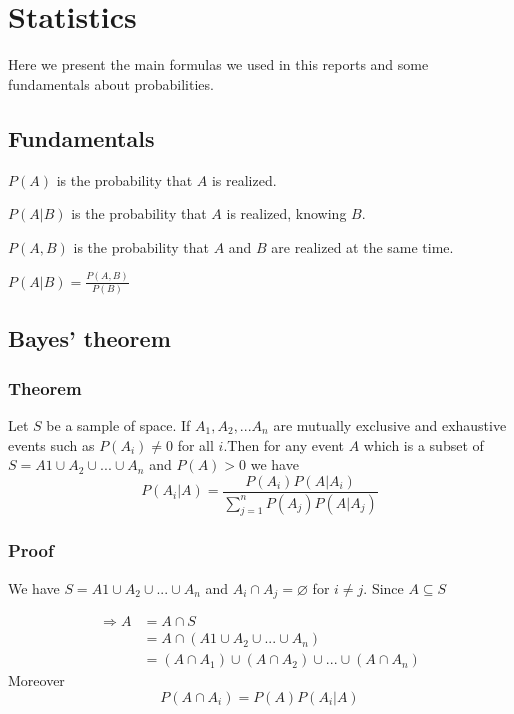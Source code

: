 \chapter{Statistics}\label{app:formulas} Here we present the main formulas we used in this reports and some fundamentals about probabilities.


\section{Fundamentals}\label{f:Fundamentals}

$P(A)$ is the probability that $A$ is realized.\\
\par
$P(A|B)$ is the probability that $A$ is realized, knowing $B$.\\
\par
$P(A,B)$ is the probability that $A$ and $B$ are realized at the same time.\\
\par
$P(A|B) = \frac{P(A,B)}{P(B)}$



\section{Bayes' theorem}\label{f:Bayes}
\subsection{Theorem}
Let $S$ be a sample of space. If $A_1,A_2,...A_n$ are mutually exclusive and exhaustive events such as $P(A_i)\neq 0$ for all $i$.Then for any event $A$ which is a subset of $S = A1\cup A_2 \cup ... \cup A_n$ and $P(A) > 0$ we have
\begin{equation*}
P(A_i|A)= \frac{P(A_i)P(A|A_i)}{\sum_{j=1}^n P(A_j)P(A|A_j)}
\end{equation*}

\subsection{Proof}
We have $S = A1\cup A_2 \cup ... \cup A_n$ and $A_i \cap A_j = \varnothing$ for $i \neq j$. Since $A \subseteq S$

\begin{align*}
\Rightarrow A &= A \cap S\\
              &= A \cap (A1\cup A_2 \cup ... \cup A_n)\\
              &= (A \cap A_1)\cup(A \cap A_2)\cup ... \cup(A \cap A_n)
\end{align*}
Moreover
\begin{equation*}
P(A \cap A_i) = P(A)P(A_i|A)
\end{equation*}

